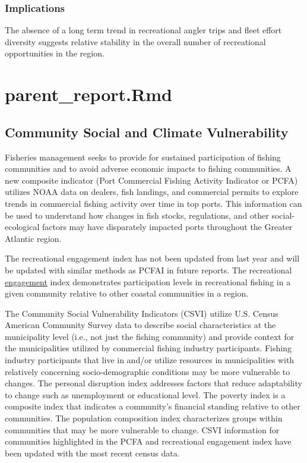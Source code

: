 \documentclass[
  10pt,
]{article}
\begin{document}
\subsubsection{Implications}\label{implications-2}

The absence of a long term trend in recreational angler trips and fleet effort diversity suggests relative stability in the overall number of recreational opportunities in the region.

\section{parent\_report.Rmd}\label{parent_report.rmd-3}

\subsection{Community Social and Climate Vulnerability}\label{community-social-and-climate-vulnerability}

Fisheries management seeks to provide for sustained participation of fishing communities and to avoid adverse economic impacts to fishing communities. A new composite indicator (Port Commercial Fishing Activity Indicator or PCFA) utilizes NOAA data on dealers, fish landings, and commercial permits to explore trends in commercial fishing activity over time in top ports. This information can be used to understand how changes in fish stocks, regulations, and other social-ecological factors may have disparately impacted ports throughout the Greater Atlantic region.

The recreational engagement index has not been updated from last year and will be updated with similar methods as PCFAI in future reports. The recreational \href{https://noaa-edab.github.io/catalog/engagement.html}{engagement} index demonstrates participation levels in recreational fishing in a given community relative to other coastal communities in a region.

The Community Social Vulnerability Indicators (CSVI) utilize U.S. Census American Community Survey data to describe social characteristics at the municipality level (i.e., not just the fishing community) and provide context for the municipalities utilized by commercial fishing industry participants. Fishing industry participants that live in and/or utilize resources in municipalities with relatively concerning socio-demographic conditions may be more vulnerable to changes. The personal disruption index addresses factors that reduce adaptability to change such as unemployment or educational level. The poverty index is a composite index that indicates a community's financial standing relative to other communities. The population composition index characterizes groups within communities that may be more vulnerable to change. CSVI information for communities highlighted in the PCFA and recreational engagement index have been updated with the most recent census data.
\end{document}
